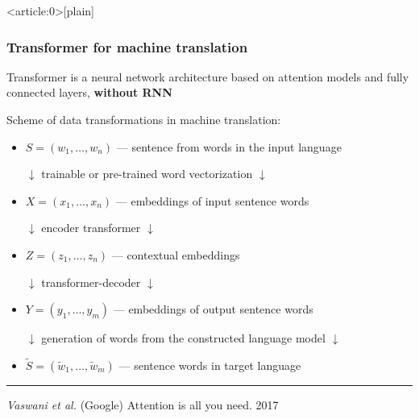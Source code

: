 \documentclass[fullscreen=true, bookmarks=true, hyperref={pdfencoding=unicode}]{beamer}
\begin{document}
{ %
    \begin{frame}<article:0>[plain]
     \end{frame}
}


\begin{frame}
  \frametitle{Transformer for machine translation}

  Transformer is a neural network architecture based on attention models and fully connected layers, {\bf without RNN}

  \pause
  Scheme of data transformations in machine translation:

  \begin{itemize}
    \item $S = (w_1, \dots, w_n)$ — sentence from words in the input language

          $\downarrow$ trainable or pre-trained word vectorization $\downarrow$
    \item $X = (x_1, \dots, x_n)$ — embeddings of input sentence words

          $\downarrow$ encoder transformer $\downarrow$
    \item $Z = (z_1, \dots, z_n)$ — contextual embeddings

          $\downarrow$ transformer-decoder $\downarrow$
    \item $Y = (y_1, \dots, y_m)$ — embeddings of output sentence words

          $\downarrow$ generation of words from the constructed language model $\downarrow$
    \item $\tilde S = (\tilde w_1, \dots, \tilde w_m)$ — sentence words in target language
  \end{itemize}

  \noindent\rule{8cm}{0.4pt}

  {\small
  {\it Vaswani et al.} (Google) Attention is all you need. 2017}
\end{frame}
\end{document}

